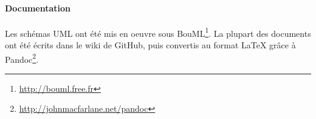 \paragraph{Documentation}

Les schémas UML ont été mis en oeuvre sous BouML\footnote{\url{http://bouml.free.fr}}. La plupart des
documents ont été écrits dans le wiki de GitHub, puis convertis au
format \LaTeX{} grâce à Pandoc\footnote{\url{http://johnmacfarlane.net/pandoc}}.

